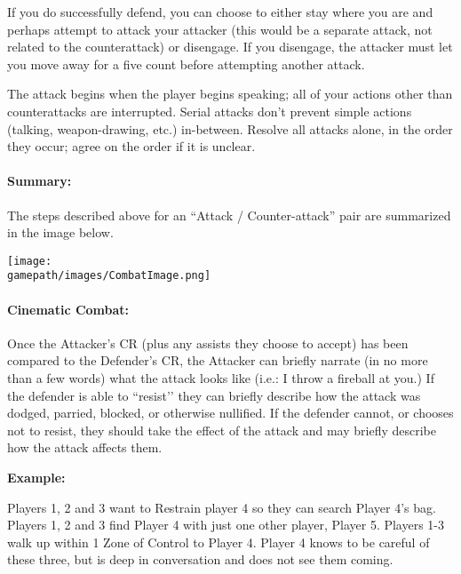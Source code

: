 \documentclass[sheet]{GL2020}
\begin{document}
If you do successfully defend, you can choose to either stay where you are and perhaps attempt to attack your attacker (this would be a separate attack, not related to the counterattack) or disengage. If you disengage, the attacker must let you move away for a five count before attempting another attack. 

The attack begins when the player begins speaking; all of your actions other than counterattacks are interrupted. Serial attacks don't prevent simple actions (talking, weapon-drawing, etc.) in-between. Resolve all attacks alone, in the order they occur; agree on the order if it is unclear. 

\paragraph{Summary:} The steps described above for an ``Attack / Counter-attack” pair are summarized in the image below.
\begin{center}
\texttt{[image: \\gamepath/images/CombatImage.png]}
\end{center}

\paragraph{Cinematic Combat:} Once the Attacker's CR (plus any assists they choose to accept) has been compared to the Defender's CR, the Attacker can briefly narrate (in no more than a few words) what the attack looks like (i.e.: I throw a fireball at you.) If the defender is able to ``resist'’ they can briefly describe how the attack was dodged, parried, blocked, or otherwise nullified. If the defender cannot, or chooses not to resist, they should take the effect of the attack and may briefly describe how the attack affects them.

\textbf{Example:}\newline

Players 1, 2 and 3 want to Restrain player 4 so they can search Player 4’s bag. Players 1, 2 and 3 find Player 4 with just one other player, Player 5. Players 1-3 walk up within 1 Zone of Control to Player 4. Player 4 knows to be careful of these three, but is deep in conversation and does not see them coming.
\end{document}
